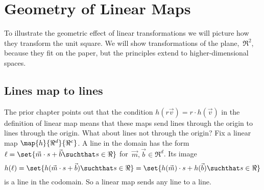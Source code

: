 \chapter{Geometry of Linear Maps}

To illustrate the geometric effect of linear transformations 
we will picture how they transform the unit square.
We will show transformations of the plane,~$\Re^2$,
because they fit on the paper, but the principles extend to 
higher-dimensional spaces.




\section{Lines map to lines}
The prior chapter points out that 
the condition $h(r\vec{v})=r\cdot h(\vec{v})$ in the definition
of linear map means that
these maps send lines through the origin to lines through the origin.
What about lines not through the origin?
Fix a linear map $\map{h}{\Re^d}{\Re^c}$.
A line in the domain has the form 
$\ell = \set{\vec{m}\cdot s +\vec{b}\suchthat s\in\Re}$
for~$\vec{m}, \vec{b}\in\Re^d$.
Its image
\begin{equation*}
  h(\ell)=\set{h(\vec{m}\cdot s+\vec{b})\suchthat s\in\Re}
  =\set{h(\vec{m})\cdot s+h(\vec{b})\suchthat s\in\Re}
\end{equation*}
is a line in the codomain.
So a linear map sends any line to a line. 

